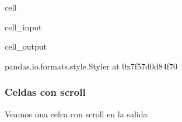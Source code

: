 \documentclass[letterpaper,10pt,english]{jupyterBook}
\begin{document}
\begin{sphinxuseclass}{cell}
\begin{sphinxVerbatimInput}
\begin{sphinxuseclass}{cell_input}
\begin{sphinxVerbatim}[commandchars=\\\{\}]
 
        
     \PYG{p}{[}        \PYG{p}{]}

\PYGZbs{}
    \PYGZbs{}
    \PYGZbs{}
\end{sphinxVerbatim}

\end{sphinxuseclass}\end{sphinxVerbatimInput}
\begin{sphinxVerbatimOutput}

\begin{sphinxuseclass}{cell_output}
\begin{sphinxVerbatim}[commandchars=\\\{\}]
\PYGZlt{}pandas.io.formats.style.Styler at 0x7f57d0d84f70\PYGZgt{}
\end{sphinxVerbatim}

\end{sphinxuseclass}\end{sphinxVerbatimOutput}

\end{sphinxuseclass}

\subsubsection{Celdas con scroll}
\label{\detokenize{docs/01_01_Code_Blocks:celdas-con-scroll}}
\sphinxAtStartPar
Veamos una celca con scroll en la salida
\end{document}
